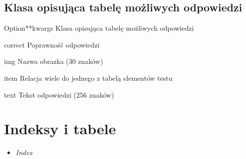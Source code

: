 \documentclass[letterpaper,10pt,polish]{manual}
\begin{document}
\section{Klasa opisująca tabelę możliwych odpowiedzi}

\hypertarget{dbmodel.Option}{}\begin{classdesc}{Option}{**kwargs}
Klasa opisująca tabelę możliwych odpowiedzi

\hypertarget{dbmodel.Option.correct}{}\begin{memberdesc}{correct}
Poprawność odpowiedzi
\end{memberdesc}

\hypertarget{dbmodel.Option.img}{}\begin{memberdesc}{img}
Nazwa obrazka (30 znaków)
\end{memberdesc}

\hypertarget{dbmodel.Option.item}{}\begin{memberdesc}{item}
Relacja wiele do jednego z tabelą elementów testu
\end{memberdesc}

\hypertarget{dbmodel.Option.text}{}\begin{memberdesc}{text}
Tekst odpowiedzi (256 znaków)
\end{memberdesc}
\end{classdesc}


\chapter{Indeksy i tabele}
\begin{itemize}
\item {} 
\emph{Index}

\end{itemize}


\renewcommand{\indexname}{Indeks modułów}
\printmodindex
\renewcommand{\indexname}{Indeks}
\printindex
\end{document}

